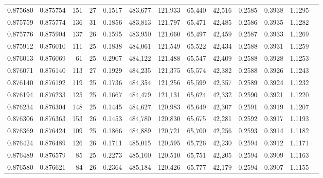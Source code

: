 \begin{tabular}{rrrrrrrrrrrrr}
0.875680 & 0.875754 &   151 &  27 &                                     0.1517 & 483,677 & 121,933 &  65,440 &  42,516 & 0.2585 & 0.3938 & 1.1295 \\
0.875759 & 0.875774 &   136 &  31 &                                     0.1856 & 483,813 & 121,797 &  65,471 &  42,485 & 0.2586 & 0.3935 & 1.1282 \\
0.875776 & 0.875904 &   137 &  26 &                                     0.1595 & 483,950 & 121,660 &  65,497 &  42,459 & 0.2587 & 0.3933 & 1.1269 \\
0.875912 & 0.876010 &   111 &  25 &                                     0.1838 & 484,061 & 121,549 &  65,522 &  42,434 & 0.2588 & 0.3931 & 1.1259 \\
0.876013 & 0.876069 &    61 &  25 &                                     0.2907 & 484,122 & 121,488 &  65,547 &  42,409 & 0.2588 & 0.3928 & 1.1253 \\
0.876071 & 0.876140 &   113 &  27 &                                     0.1929 & 484,235 & 121,375 &  65,574 &  42,382 & 0.2588 & 0.3926 & 1.1243 \\
0.876140 & 0.876192 &   119 &  25 &                                     0.1736 & 484,354 & 121,256 &  65,599 &  42,357 & 0.2589 & 0.3924 & 1.1232 \\
0.876194 & 0.876233 &   125 &  25 &                                     0.1667 & 484,479 & 121,131 &  65,624 &  42,332 & 0.2590 & 0.3921 & 1.1220 \\
0.876234 & 0.876304 &   148 &  25 &                                     0.1445 & 484,627 & 120,983 &  65,649 &  42,307 & 0.2591 & 0.3919 & 1.1207 \\
0.876306 & 0.876363 &   153 &  26 &                                     0.1453 & 484,780 & 120,830 &  65,675 &  42,281 & 0.2592 & 0.3917 & 1.1193 \\
0.876369 & 0.876424 &   109 &  25 &                                     0.1866 & 484,889 & 120,721 &  65,700 &  42,256 & 0.2593 & 0.3914 & 1.1182 \\
0.876424 & 0.876489 &   126 &  26 &                                     0.1711 & 485,015 & 120,595 &  65,726 &  42,230 & 0.2594 & 0.3912 & 1.1171 \\
0.876489 & 0.876579 &    85 &  25 &                                     0.2273 & 485,100 & 120,510 &  65,751 &  42,205 & 0.2594 & 0.3909 & 1.1163 \\
0.876580 & 0.876621 &    84 &  26 &                                     0.2364 & 485,184 & 120,426 &  65,777 &  42,179 & 0.2594 & 0.3907 & 1.1155 \\

\end{tabular}
